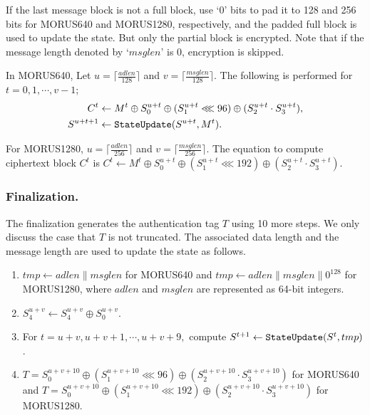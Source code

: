 \documentclass{llncs}
\newcommand{\cipher}[1]{\textsf{#1}}
\begin{document}
If the last message block is not a full block, use `0' bits to pad it to 128 and 256 bits for \cipher{MORUS640} and \cipher{MORUS1280}, respectively, and the padded full block is used to update the state. But only the partial block is encrypted. Note that if the message length denoted by `$msglen$' is 0, encryption is skipped.

In \cipher{MORUS640}, Let $u = \lceil \frac{adlen}{128} \rceil$ and $v = \lceil \frac{msglen}{128} \rceil$. The following is performed for $t=0, 1, \cdots, v-1$;
\begin{align*}
C^t &\leftarrow M^t \oplus S^{u+t}_0 \oplus (S^{u+t}_1 \lll 96) \oplus (S^{u+t}_2 \cdot S^{u+t}_3),\\
S^{u+t+1} &\leftarrow {\tt StateUpdate}(S^{u+t},M^t).
\end{align*}

For \cipher{MORUS1280}, $u = \lceil \frac{adlen}{256} \rceil$ and $v = \lceil \frac{msglen}{256} \rceil$. The equation to compute ciphertext block $C^t$ is $C^t \leftarrow M^t \oplus S^{u+t}_0 \oplus (S^{u+t}_1 \lll 192) \oplus (S^{u+t}_2 \cdot S^{u+t}_3)$.

\subsubsection{Finalization.}
The finalization generates the authentication tag $T$ using 10 more steps. We only discuss the case that $T$ is not truncated. The associated data length and the message length are used to update the state as follows.
\begin{enumerate}
\item $tmp \leftarrow adlen\|msglen$ for \cipher{MORUS640} and $tmp \leftarrow adlen\|msglen\|0^{128}$ for \cipher{MORUS1280}, where $adlen$ and $msglen$ are represented as 64-bit integers.
\item $S^{u+v}_4 \leftarrow S^{u+v}_4 \oplus S^{u+v}_0.$
\item For $t = u+v, u+v+1, \cdots, u+v+9,$ compute
$S^{t+1} \leftarrow {\tt StateUpdate} (S^t, tmp)$.
\item $T = S^{u+v+10}_0 \oplus (S^{u+v+10}_1 \lll 96) \oplus ( S^{u+v+10}_2 \cdot S^{u+v+10}_3)$ for \cipher{MORUS640} and $T = S^{u+v+10}_0 \oplus (S^{u+v+10}_1 \lll 192) \oplus ( S^{u+v+10}_2 \cdot S^{u+v+10}_3)$ for \cipher{MORUS1280}.
\end{enumerate}
\end{document}

